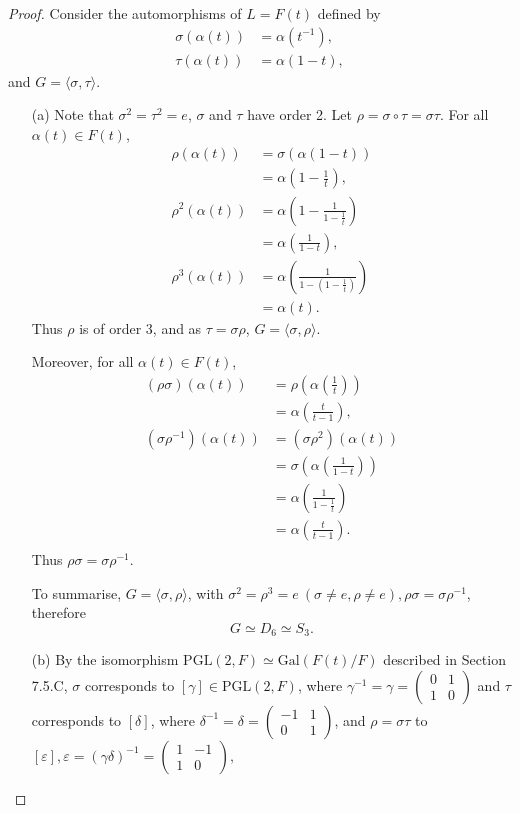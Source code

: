 \documentclass[11pt,a4paper]{article}
\newcommand{\Gal}{\mathrm{Gal}}
\begin{document}
\begin{proof}
Consider the automorphisms of $L = F(t)$ defined by
\begin{align*}
\sigma(\alpha(t))&=\alpha(t^{-1}),\\
\tau(\alpha(t)) &= \alpha(1-t),
\end{align*}
and $G =\langle \sigma,\tau \rangle$.
\begin{enumerate}
\item[(a)]
Note that $\sigma^2 = \tau^2 = e$, $\sigma$ and  $\tau$ have order 2. 
Let $\rho = \sigma \circ \tau = \sigma \tau$. For all $\alpha(t) \in F(t)$, 
\begin{align*}
\rho(\alpha(t))&= \sigma(\alpha(1-t))\\
&=\alpha\left(1-\frac{1}{t}\right),\\
\rho^2(\alpha(t))&= \alpha\left(1 - \frac{1}{1-\frac{1}{t}}\right)\\
&= \alpha\left(\frac{1}{1-t}\right),\\
\rho^3(\alpha(t))&= \alpha\left(\frac{1}{1-\left( 1 - \frac{1}{t} \right)}\right)\\
&=\alpha(t).
\end{align*}
Thus $\rho$ is of order 3, and as $\tau = \sigma \rho$, $G = \langle \sigma, \rho \rangle.$

Moreover, for all $\alpha(t) \in F(t)$,
\begin{align*}
(\rho\sigma)(\alpha(t))&= \rho\left ( \alpha\left(\frac{1}{t}\right)\right)\\
&=\alpha\left(\frac{t}{t-1}\right),\\
(\sigma \rho^{-1})(\alpha(t))&= (\sigma \rho^2)(\alpha(t))\\
&=\sigma\left(\alpha\left(\frac{1}{1-t}\right)\right)\\
&=\alpha\left(\frac{1}{1-\frac{1}{t}} \right)\\
&=\alpha\left(\frac{t}{t-1}\right).\\
\end{align*}
Thus $\rho \sigma = \sigma \rho^{-1}$.

To summarise, $G = \langle \sigma,\rho \rangle$, with
$\sigma^2 = \rho^3=e\ (\sigma \neq e, \rho\neq e), \rho \sigma = \sigma \rho^{-1}$, therefore 
$$G \simeq D_6 \simeq S_3.$$

\item[(b)]
By the isomorphism $\mathrm{PGL}(2,F) \simeq \Gal(F(t)/F)$ described in Section 7.5.C, $\sigma$ corresponds to $[\gamma] \in \mathrm{PGL}(2,F)$, where 
$\gamma^{-1} = \gamma = 
\left(
\begin{array}{ccc}
 0 &  1    \\
1  &   0  
\end{array}
\right)
$ and $\tau$ corresponds to $[\delta]$, where 
$\delta^{-1} = \delta =
\left(
\begin{array}{ccc}
 -1 &  1    \\
0  &   1  
\end{array}
\right)
$, and $\rho=\sigma \tau$ to $[\varepsilon], \varepsilon = (\gamma \delta)^{-1} = 
\left(
\begin{array}{ccc}
 1 &  -1    \\
1  &   0  
\end{array}
\right),$


\end{enumerate}
\end{proof}
\end{document}
